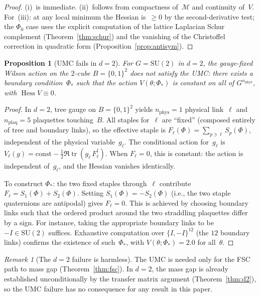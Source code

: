 \documentclass[11pt,a4paper]{article}
\theoremstyle{plain}
\newtheorem{proposition}[theorem]{Proposition}
\theoremstyle{definition}
\theoremstyle{remark}
\newtheorem{remark}[theorem]{Remark}
\newcommand{\tr}{\operatorname{tr}}
\newcommand{\Hess}{\operatorname{Hess}}
\newcommand{\SU}{\mathrm{SU}}
\begin{document}
\begin{proof}
(i)~is immediate.  (ii)~follows from compactness
of~$\mathcal{M}$ and continuity of~$V$.  For~(iii):
at any local minimum the Hessian is~$\geq 0$ by the
second-derivative test; the $\Phi_0$ case uses the
explicit computation of the lattice Laplacian Schur
complement (Theorem~\ref{thm:schur}) and the vanishing
of the Christoffel correction in quadratic form
(Proposition~\ref{prop:antisym}).
\end{proof}

\begin{proposition}[UMC fails in $d = 2$]
\label{prop:umc_d2_fail}
For $G = \SU(2)$ in $d = 2$, the gauge-fixed Wilson action on
the $2$-cube $B = \{0,1\}^2$ does \emph{not} satisfy the UMC:
there exists a boundary condition~$\Phi_*$ such that the action
$V(\theta;\Phi_*)$ is constant on all of $G^{n_{\mathrm{phys}}}$,
with $\Hess V \equiv 0$.
\end{proposition}

\begin{proof}
In $d = 2$, tree gauge on $B = \{0,1\}^2$ yields
$n_{\mathrm{phys}} = 1$ physical link~$\ell$ and
$n_{\mathrm{plaq}} = 5$ plaquettes touching~$B$.
All staples for~$\ell$ are ``fixed'' (composed entirely of
tree and boundary links), so the effective staple is
$F_\ell(\Phi) = \sum_{p \ni \ell} S_p(\Phi)$,
independent of the physical variable~$g_\ell$.
The conditional action for~$g_\ell$ is
$V_\ell(g) = \mathrm{const} - \tfrac{1}{2}\Re\tr(g_\ell\,
F_\ell^\dagger)$.
When $F_\ell = 0$, this is constant: the action is independent
of~$g_\ell$, and the Hessian vanishes identically.

To construct $\Phi_*$: the two fixed staples through~$\ell$
contribute $F_\ell = S_1(\Phi) + S_2(\Phi)$.
Setting $S_1(\Phi) = -S_2(\Phi)$ (i.e., the two staple
quaternions are antipodal) gives $F_\ell = 0$.
This is achieved by choosing boundary links such that the
ordered product around the two straddling plaquettes differ
by a sign.  For instance, taking the appropriate boundary
links to be $-I \in \SU(2)$ suffices.
Exhaustive computation over $\{I, -I\}^{12}$ (the $12$
boundary links) confirms the existence of such~$\Phi_*$,
with $V(\theta;\Phi_*) = 2.0$ for all~$\theta$.
\end{proof}

\begin{remark}[The $d = 2$ failure is harmless]
\label{rem:umc_d2}
The UMC is needed only for the FSC path to mass gap
(Theorem~\ref{thm:fsc}).  In $d = 2$, the mass gap is
already established unconditionally by the transfer matrix
argument (Theorem~\ref{thm:d2}), so the UMC failure has
no consequence for any result in this paper.
\end{remark}
\end{document}
